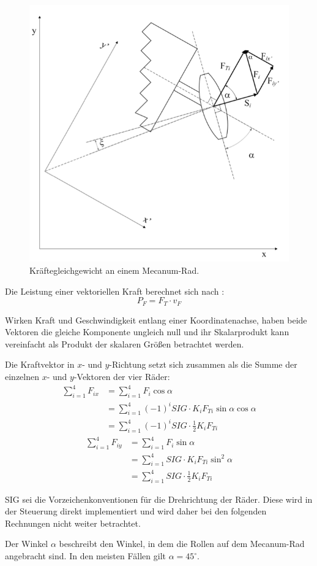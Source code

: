 \begin{figure}[H]
    \centering
    \includegraphics[width=.6\textwidth]{Abbildungen/Kraefte-am-Rad}
    \caption{Kräftegleichgewicht an einem Mecanum-Rad.}
\end{figure}

Die Leistung einer vektoriellen Kraft berechnet sich nach : 
$$ P_F = F_T \cdot v_F $$

Wirken Kraft und Geschwindigkeit entlang einer Koordinatenachse, haben beide Vektoren die gleiche Komponente ungleich null und ihr Skalarprodukt kann vereinfacht als Produkt der skalaren Größen betrachtet werden.

Die Kraftvektor in $x$- und $y$-Richtung setzt sich zusammen als die Summe der einzelnen $x$- und $y$-Vektoren der vier Räder:
\begin{align*}
    \sum_{i=1}^4 F_{ix} &= \sum_{i=1}^4 F_i \cos \alpha \\
    &= \sum_{i=1}^4 (-1)^i SIG \cdot K_i F_{Ti} \sin \alpha \cos \alpha \\
    &= \sum_{i=1}^4 (-1)^i SIG \cdot \frac{1}{2} K_i F_{Ti}
\end{align*}
\begin{align*}
    \sum_{i=1}^4 F_{iy} &= \sum_{i=1}^4 F_i \sin \alpha \\
    &= \sum_{i=1}^4 SIG \cdot K_i F_{Ti} \sin^2 \alpha \\
    &= \sum_{i=1}^4 SIG \cdot \frac{1}{2} K_i F_{Ti}
\end{align*}

SIG sei die Vorzeichenkonventionen für die Drehrichtung der Räder.
Diese wird in der Steuerung direkt implementiert und wird daher bei den folgenden Rechnungen nicht weiter betrachtet.

Der Winkel $ \alpha $ beschreibt den Winkel, in dem die Rollen auf dem Mecanum-Rad angebracht sind.
In den meisten Fällen gilt $\alpha = 45^\circ$.

